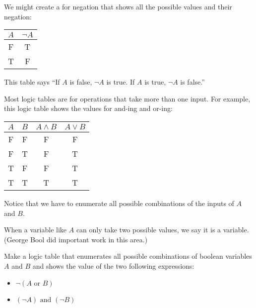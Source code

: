 We might create a  for negation that shows all
the possible values and their negation:

\begin{tabular}{c | c}
  $A$ & $\neg A$ \\
  \hline
  F & T \\
  T & F
\end{tabular}

This table says ``If $A$ is false, $\neg A$ is true. If $A$ is true,
$\neg A$ is false.''

Most logic tables are for operations that take more than one input.
For example, this logic table shows the values for and-ing and or-ing:

\begin{tabular}{c | c | c | c}
  $A$ & $B$ & $A \land B$ & $A \lor B$ \\
  \hline
  F & F & F & F \\
  F & T & F & T \\
  T & F & F & T \\
  T & T & T & T \\
\end{tabular}

Notice that we have to enumerate all possible combinations of the
inputs of $A$ and $B$.

When a variable like $A$ can only take two possible values, we say it
is a  variable. (George Bool did important work in
this area.)

\begin{Exercise}[title={Logic Table}, label=logic_table]

  Make a logic table that enumerates all possible combinations of boolean variables $A$ and $B$ and shows the value of the two following expressions:
  \begin{itemize}
  \item $\neg \left(A \text{ or } B \right)$
  \item $\left(\neg A \right) \text{ and } \left(\neg B \right)$ 
  \end{itemize}

\end{Exercise}

